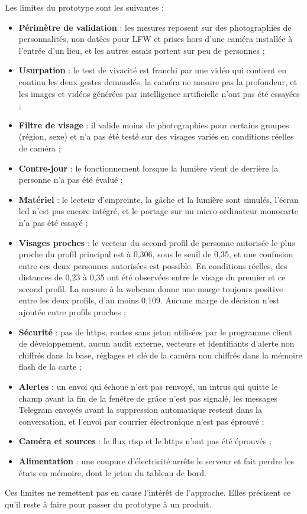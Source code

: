 \begin{maj}
Les limites du prototype sont les suivantes :
\begin{itemize}
  \item \textbf{Périmètre de validation} : les mesures reposent sur des photographies de personnalités, non datées pour LFW et prises hors d'une caméra installée à l'entrée d'un lieu, et les autres essais portent sur peu de personnes ;
  \item \textbf{Usurpation} : le test de vivacité est franchi par une vidéo qui contient en continu les deux gestes demandés, la caméra ne mesure pas la profondeur, et les images et vidéos générées par intelligence artificielle n'ont pas été essayées ;
  \item \textbf{Filtre de visage} : il valide moins de photographies pour certains groupes (région, sexe) et n'a pas été testé sur des visages variés en conditions réelles de caméra ;
  \item \textbf{Contre-jour} : le fonctionnement lorsque la lumière vient de derrière la personne n'a pas été évalué\nouvmark{} ;
  \item \textbf{Matériel} : le lecteur d'empreinte, la gâche et la lumière sont simulés, l'écran \gls{lcd} n'est pas encore intégré, et le portage sur un micro-ordinateur monocarte n'a pas été essayé ;
  \item \textbf{Visages proches} : le vecteur du second profil de personne autorisée le plus proche du profil principal est à 0,306, sous le seuil de 0,35, et une confusion entre ces deux personnes autorisées est possible. En conditions réelles, des distances de 0,23 à 0,35 ont été observées entre le visage du premier et ce second profil. La mesure à la webcam donne une marge toujours positive entre les deux profils, d'au moins 0,109. Aucune marge de décision n'est ajoutée entre profils proches ;
  \item \textbf{Sécurité} : pas de \gls{https}, routes sans jeton utilisées par le programme client de développement, aucun audit externe, vecteurs et identifiants d'alerte non chiffrés dans la base, réglages et clé de la caméra non chiffrés dans la mémoire flash de la carte ;
  \item \textbf{Alertes} : un envoi qui échoue n'est pas renvoyé, un intrus qui quitte le champ avant la fin de la fenêtre de grâce n'est pas signalé, les messages Telegram envoyés avant la suppression automatique restent dans la conversation, et l'envoi par courrier électronique n'est pas éprouvé ;
  \item \textbf{Caméra et sources} : le flux \gls{rtsp} et le \gls{https} n'ont pas été éprouvés ;
  \item \textbf{Alimentation} : une coupure d'électricité arrête le serveur et fait perdre les états en mémoire, dont le jeton du tableau de bord.
\end{itemize}
Ces limites ne remettent pas en cause l'intérêt de l'approche. Elles précisent ce qu'il reste à faire pour passer du prototype à un produit.
\end{maj}

